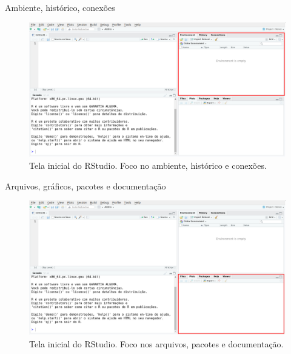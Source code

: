 \documentclass[
  ignorenonframetext,
  serif,
  professionalfont,
  usenames,
  dvipsnames,
  aspectratio = 169]{beamer}
\begin{document}
\begin{frame}{Ambiente, histórico, conexões}
\protect\hypertarget{ambiente-histuxf3rico-conexuxf5es}{}
\begin{figure}

{\centering \includegraphics[width=0.85\linewidth]{./img/env} 

}

\caption{Tela inicial do RStudio. Foco no ambiente, histórico e conexões.}\label{fig:unnamed-chunk-7}
\end{figure}
\end{frame}

\begin{frame}{Arquivos, gráficos, pacotes e documentação}
\protect\hypertarget{arquivos-gruxe1ficos-pacotes-e-documentauxe7uxe3o}{}
\begin{figure}

{\centering \includegraphics[width=0.85\linewidth]{./img/files} 

}

\caption{Tela inicial do RStudio. Foco nos arquivos, pacotes e documentação.}\label{fig:unnamed-chunk-8}
\end{figure}
\end{frame}
\end{document}
